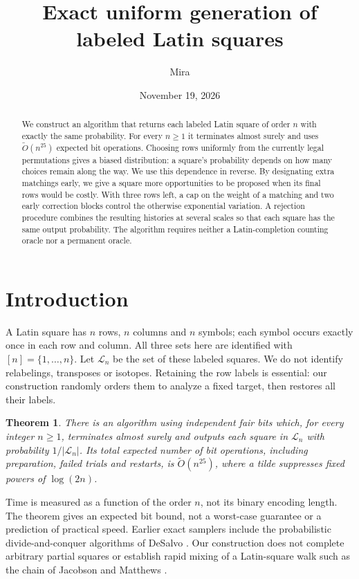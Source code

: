 \documentclass[11pt]{article}
\title{Exact uniform generation of labeled Latin squares}
\author{Mira}
\date{November 19, 2026}
\newtheorem{theorem}{Theorem}[section]
\theoremstyle{definition}\newtheorem{definition}[theorem]{Definition}
\newcommand{\cL}{\mathcal L}
\begin{document}
\maketitle
\begin{abstract}
We construct an algorithm that returns each labeled Latin square of order $n$ with exactly the same probability. For every $n\ge1$ it terminates almost surely and uses $\widetilde O(n^{25})$ expected bit operations. Choosing rows uniformly from the currently legal permutations gives a biased distribution: a square's probability depends on how many choices remain along the way. We use this dependence in reverse. By designating extra matchings early, we give a square more opportunities to be proposed when its final rows would be costly. With three rows left, a cap on the weight of a matching and two early correction blocks control the otherwise exponential variation. A rejection procedure combines the resulting histories at several scales so that each square has the same output probability. The algorithm requires neither a Latin-completion counting oracle nor a permanent oracle.
\end{abstract}
\section{Introduction}
A Latin square has $n$ rows, $n$ columns and $n$ symbols; each symbol occurs exactly once in each row and column. All three sets here are identified with $[n]=\{1,\ldots,n\}$. Let $\cL_n$ be the set of these labeled squares. We do not identify relabelings, transposes or isotopes. Retaining the row labels is essential: our construction randomly orders them to analyze a fixed target, then restores all their labels.

\begin{theorem}\label{thm:main}
There is an algorithm using independent fair bits which, for every integer $n\ge1$, terminates almost surely and outputs each square in $\cL_n$ with probability $1/|\cL_n|$. Its total expected number of bit operations, including preparation, failed trials and restarts, is $\widetilde O(n^{25})$, where a tilde suppresses fixed powers of $\log(2n)$.
\end{theorem}
Time is measured as a function of the order $n$, not its binary encoding length. The theorem gives an expected bit bound, not a worst-case guarantee or a prediction of practical speed. Earlier exact samplers include the probabilistic divide-and-conquer algorithms of DeSalvo \cite{DeSalvo}. Our construction does not complete arbitrary partial squares or establish rapid mixing of a Latin-square walk such as the chain of Jacobson and Matthews \cite{JM}.
\end{document}
